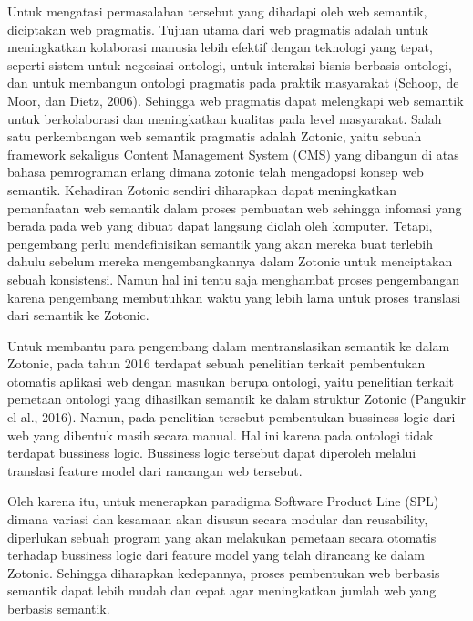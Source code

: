 Untuk mengatasi permasalahan tersebut yang dihadapi oleh web semantik, diciptakan web pragmatis. Tujuan utama dari web pragmatis adalah untuk meningkatkan kolaborasi manusia lebih efektif dengan teknologi yang tepat, seperti sistem untuk negosiasi ontologi, untuk interaksi bisnis berbasis ontologi, dan untuk membangun ontologi pragmatis pada praktik masyarakat (Schoop, de Moor, dan Dietz, 2006). Sehingga web pragmatis dapat melengkapi web semantik untuk berkolaborasi dan meningkatkan kualitas pada level masyarakat. Salah satu perkembangan web semantik pragmatis adalah Zotonic, yaitu sebuah framework sekaligus Content Management System (CMS) yang dibangun di atas bahasa pemrograman erlang dimana zotonic telah mengadopsi konsep web semantik. Kehadiran Zotonic sendiri diharapkan dapat meningkatkan pemanfaatan web semantik dalam proses pembuatan web sehingga infomasi yang berada pada web yang dibuat dapat langsung diolah oleh komputer. Tetapi, pengembang perlu mendefinisikan semantik yang akan mereka buat terlebih dahulu sebelum mereka mengembangkannya dalam Zotonic untuk menciptakan sebuah konsistensi. Namun hal ini tentu saja menghambat proses pengembangan karena pengembang membutuhkan waktu yang lebih lama untuk proses translasi dari semantik ke Zotonic.

Untuk membantu para pengembang dalam mentranslasikan semantik ke dalam Zotonic, pada tahun 2016 terdapat sebuah penelitian terkait pembentukan otomatis aplikasi web dengan masukan berupa ontologi, yaitu penelitian terkait pemetaan ontologi yang dihasilkan semantik ke dalam struktur Zotonic (Pangukir el al., 2016). Namun, pada penelitian tersebut pembentukan bussiness logic dari web yang dibentuk masih secara manual. Hal ini karena pada ontologi tidak terdapat bussiness logic. Bussiness logic tersebut dapat diperoleh melalui translasi feature model dari rancangan web tersebut.

Oleh karena itu, untuk menerapkan paradigma Software Product Line (SPL) dimana variasi dan kesamaan akan disusun secara modular dan reusability, diperlukan sebuah program yang akan melakukan pemetaan secara otomatis terhadap bussiness logic dari feature model yang telah dirancang ke dalam Zotonic. Sehingga diharapkan kedepannya, proses pembentukan web berbasis semantik dapat lebih mudah dan cepat agar meningkatkan jumlah web yang berbasis semantik. \\


